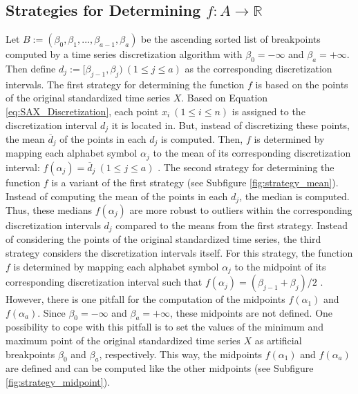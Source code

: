 \subsection*{Strategies for Determining $f: A \rightarrow \mathbb{R}$} \label{function_strategies}
Let $B := (\beta_0,\beta_1,...,\beta_{a-1},\beta_a)$ be the ascending sorted list of breakpoints computed by a time series discretization algorithm with $\beta_0 = -\infty$ and $\beta_a = +\infty$. Then define $d_j := [\beta_{j-1},\beta_j) \ (1 \leq j \leq a)$ as the corresponding discretization intervals. \newline
The first strategy for determining the function $f$ is based on the points of the original standardized time series $X$. Based on Equation \ref{eq:SAX_Discretization}, each point $x_i \ (1 \leq i \leq n)$ is assigned to the discretization interval $d_j$ it is located in. But, instead of discretizing these points, the mean $\overline{d}_j$ of the points in each $d_j$ is computed. Then, $f$ is determined by mapping each alphabet symbol $\alpha_j$ to the mean of its corresponding discretization interval: $f(\alpha_j) = \overline{d}_j \ (1 \leq j \leq a)$ \cite{Comparison_SAX}. \newline
The second strategy for determining the function $f$ is a variant of the first strategy (see Subfigure \ref{fig:strategy_mean}). Instead of computing the mean of the points in each $d_j$, the median is computed. Thus, these medians $f(\alpha_j)$ are more robust to outliers within the corresponding discretization intervals $d_j$ compared to the means from the first strategy. \newline
Instead of considering the points of the original standardized time series, the third strategy considers the discretization intervals itself. For this strategy, the function $f$ is determined by mapping each alphabet symbol $\alpha_j$ to the midpoint of its corresponding discretization interval such that $f(\alpha_j) = (\beta_{j-1} + \beta_j) / 2$ \cite{Survey_Temporal_Discretization}. However, there is one pitfall for the computation of the midpoints $f(\alpha_1)$ and $f(\alpha_a)$. Since $\beta_0 = -\infty$ and $\beta_a = +\infty$, these midpoints are not defined. One possibility to cope with this pitfall is to set the values of the minimum and maximum point of the original standardized time series $X$ as artificial breakpoints $\beta_0$ and $\beta_a$, respectively. This way, the midpoints $f(\alpha_1)$ and $f(\alpha_a)$ are defined and can be computed like the other midpoints (see Subfigure \ref{fig:strategy_midpoint}).
